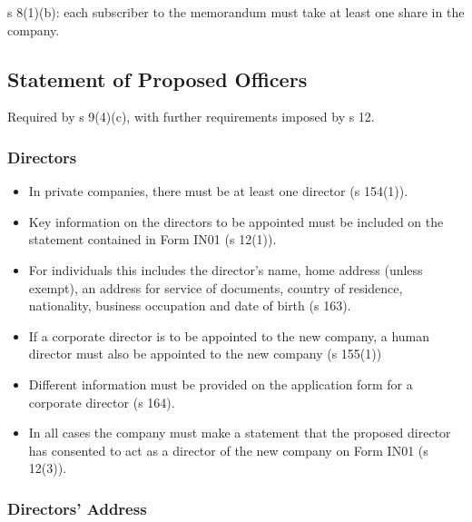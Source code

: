 \documentclass[
]{article}
\providecommand{\tightlist}{%
  \setlength{\itemsep}{0pt}\setlength{\parskip}{0pt}}
\begin{document}
s 8(1)(b): each subscriber to the memorandum must take at least one
share in the company.

\hypertarget{statement-of-proposed-officers}{%
\subsection{Statement of Proposed
Officers}\label{statement-of-proposed-officers}}

Required by s 9(4)(c), with further requirements imposed by s 12.

\hypertarget{directors}{%
\subsubsection{Directors}\label{directors}}

\begin{itemize}
\tightlist
\item
  In private companies, there must be at least one director (s 154(1)).
\item
  Key information on the directors to be appointed must be included on
  the statement contained in Form IN01 (s 12(1)).
\item
  For individuals this includes the director's name, home address
  (unless exempt), an address for service of documents, country of
  residence, nationality, business occupation and date of birth (s 163).
\item
  If a corporate director is to be appointed to the new company, a human
  director must also be appointed to the new company (s 155(1))
\item
  Different information must be provided on the application form for a
  corporate director (s 164).
\item
  In all cases the company must make a statement that the proposed
  director has consented to act as a director of the new company on Form
  IN01 (s 12(3)).
\end{itemize}

\hypertarget{directors-address}{%
\subsubsection{Directors' Address}\label{directors-address}}
\end{document}
